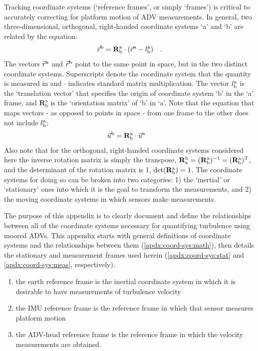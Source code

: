 \documentclass[twocol]{ametsoc}
\begin{document}
Tracking coordinate systems (`reference frames', or simply `frames') is critical to accurately correcting for platform motion of ADV measurements. In general, two three-dimensional, orthogonal, right-handed coordinate systems `a' and `b' are related by the equation:
\begin{align*}
  \vec{r}^{\mathrm{b}} &= \mathbf{R}^{\mathrm{a}}_{\mathrm{b}} \cdot (\vec{r}^{\mathrm{a}} - l_{\mathrm{b}}^{\mathrm{a}}) & .
\end{align*}
The vectors $\vec{r}^{\mathrm{a}}$ and $\vec{r}^{\mathrm{b}}$ point to the same point in space, but in the two distinct coordinate systems.  Superscripts denote the coordinate system that the quantity is measured in and $\cdot$ indicates standard matrix multiplication.  The vector $l_{\mathrm{b}}^{\mathrm{a}}$ is the `translation vector' that specifies the origin of coordinate system `b' in the `a' frame, and $\mathbf{R}^\mathrm{a}_\mathrm{b}$ is the `orientation matrix' of `b' in `a'. Note that the equation that maps vectors - as opposed to points in space - from one frame to the other does not include $l_{\mathrm{b}}^{\mathrm{a}}$:
\begin{align}
  \vec{u}^\mathrm{b} & = \mathbf{R}^{\mathrm{a}}_{\mathrm{b}} \cdot \vec{u}^\mathrm{a}
\end{align}
Also note that for the orthogonal, right-handed coordinate systems considered here the inverse rotation matrix is simply the transpose, $\mathbf{R}^{\mathrm{b}}_{\mathrm{a}}  = (\mathbf{R}^{\mathrm{a}}_{\mathrm{b}})^{-1} = (\mathbf{R}^{\mathrm{a}}_{\mathrm{b}})^\mathrm{T} $, and the determinant of the rotation matrix is 1, $\mathrm{det}(\mathbf{R}^{\mathrm{a}}_{\mathrm{b}} ) = 1$.
The coordinate systems for doing so can be broken into two categories: 1) the `inertial' or `stationary' ones into which it is the goal to transform the measurements, and 2) the moving coordinate systems in which sensors make measurements. 

The purpose of this appendix is to clearly document and define the relationships between all of the coordinate systems necessary for quantifying turbulence using moored ADVs.  This appendix starts with general definitions of coordinate systems and the relationships between them (\ref{apdx:coord-sys:math}), then details the stationary and measurement frames used herein (\ref{apdx:coord-sys:stat} and \ref{apdx:coord-sys:meas}, respectively).

\begin{enumerate}
\item the earth reference frame is the inertial coordinate system in
which it is desirable to have measurements of turbulence velocity
\item the IMU reference frame is the reference frame in which that
sensor measures platform motion
\item the ADV-head reference frame is the reference frame in which the
velocity measurements are obtained.
\end{enumerate}
\end{document}
